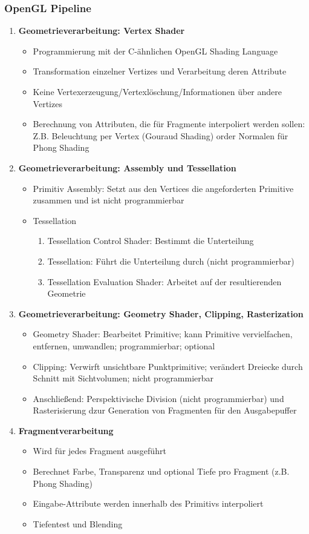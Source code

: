 \subsubsection{OpenGL Pipeline}
\begin{enumerate}
	\item \textbf{Geometrieverarbeitung: Vertex Shader}
	\begin{itemize}
		\item Programmierung mit der C-ähnlichen OpenGL Shading Language
		\item Transformation einzelner Vertizes und Verarbeitung deren Attribute
		\item Keine Vertexerzeugung/Vertexlöschung/Informationen über andere Vertizes
		\item Berechnung von Attributen, die für Fragmente interpoliert werden sollen: Z.B. Beleuchtung per Vertex (Gouraud Shading) order Normalen für Phong Shading
	\end{itemize}
	\item \textbf{Geometrieverarbeitung: Assembly und Tessellation}
	\begin{itemize}
		\item Primitiv Assembly: Setzt aus den Vertices die angeforderten Primitive zusammen und ist nicht programmierbar
		\item Tessellation
		\begin{enumerate}
			\item Tessellation Control Shader: Bestimmt die Unterteilung
			\item Tessellation: Führt die Unterteilung durch (nicht programmierbar)
			\item Tessellation Evaluation Shader: Arbeitet auf der resultierenden Geometrie
		\end{enumerate}
	\end{itemize}
	\item \textbf{Geometrieverarbeitung: Geometry Shader, Clipping, Rasterization}
	\begin{itemize}
		\item Geometry Shader: Bearbeitet Primitive; kann Primitive vervielfachen, entfernen, umwandlen; programmierbar; optional
		\item Clipping: Verwirft unsichtbare Punktprimitive; verändert Dreiecke durch Schnitt mit Sichtvolumen; nicht programmierbar
		\item Anschließend: Perspektivische Division (nicht programmierbar) und Rasterisierung dzur Generation von Fragmenten für den Ausgabepuffer
	\end{itemize}
	\item \textbf{Fragmentverarbeitung}
	\begin{itemize}
		\item Wird für jedes Fragment ausgeführt
		\item Berechnet Farbe, Transparenz und optional Tiefe pro Fragment (z.B. Phong Shading)
		\item Eingabe-Attribute werden innerhalb des Primitivs interpoliert
		\item Tiefentest und Blending
	\end{itemize}
\end{enumerate}

